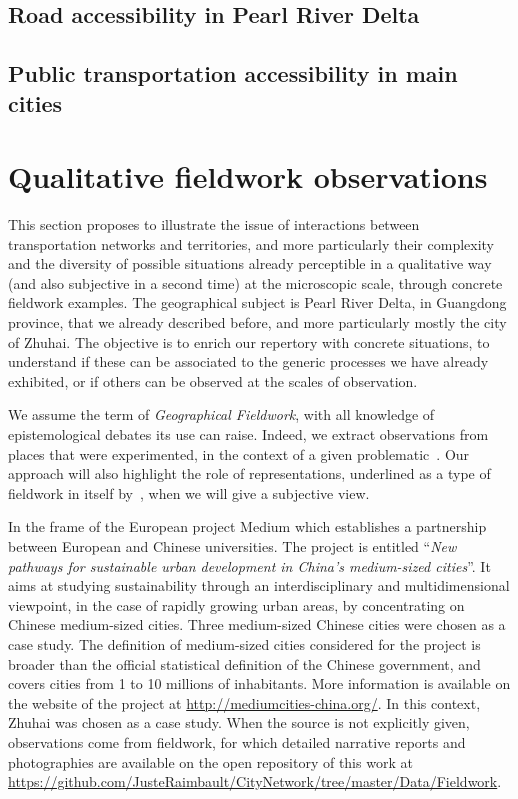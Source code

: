 \subsection{Road accessibility in Pearl River Delta}


\subsection{Public transportation accessibility in main cities}







\section{Qualitative fieldwork observations}


This section proposes to illustrate the issue of interactions between transportation networks and territories, and more particularly their complexity and the diversity of possible situations already perceptible in a qualitative way (and also subjective in a second time) at the microscopic scale, through concrete fieldwork examples. The geographical subject is Pearl River Delta, in Guangdong province, that we already described before, and more particularly mostly the city of Zhuhai. The objective is to enrich our repertory with concrete situations, to understand if these can be associated to the generic processes we have already exhibited, or if others can be observed at the scales of observation.


We assume the term of \emph{Geographical Fieldwork}, with all knowledge of epistemological debates its use can raise. Indeed, we extract observations from places that were experimented, in the context of a given problematic~\cite{retaille2010terrain}. Our approach will also highlight the role of representations, underlined as a type of fieldwork in itself by~\cite{lefort2012terrain}, when we will give a subjective view.

In the frame of the European project Medium which establishes a partnership between European and Chinese universities. The project is entitled ``\textit{New pathways for sustainable urban development in China’s medium-sized cities}''. It aims at studying sustainability through an interdisciplinary and multidimensional viewpoint, in the case of rapidly growing urban areas, by concentrating on Chinese medium-sized cities. Three medium-sized Chinese cities were chosen as a case study. The definition of medium-sized cities considered for the project is broader than the official statistical definition of the Chinese government, and covers cities from 1 to 10 millions of inhabitants. More information is available on the website of the project at \url{http://mediumcities-china.org/}. In this context, Zhuhai was chosen as a case study. When the source is not explicitly given, observations come from fieldwork, for which detailed narrative reports and photographies are available on the open repository of this work at \url{https://github.com/JusteRaimbault/CityNetwork/tree/master/Data/Fieldwork}.

